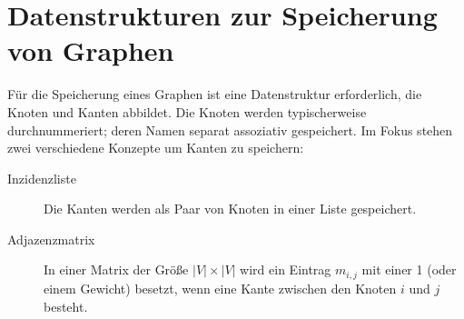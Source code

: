 \section{Datenstrukturen zur Speicherung von Graphen}
%
Für die Speicherung eines Graphen ist eine Datenstruktur erforderlich, die Knoten und Kanten abbildet. Die Knoten werden typischerweise durchnummeriert; deren Namen separat assoziativ gespeichert. Im Fokus stehen zwei verschiedene Konzepte um Kanten zu speichern:
%
\begin{description}
  \item[Inzidenzliste]
    Die Kanten werden als Paar von Knoten in einer Liste gespeichert.
  \item[Adjazenzmatrix]
    In einer Matrix der Größe $|V|\times |V|$ wird ein Eintrag $m_{i,j}$ mit einer 1 (oder einem Gewicht) besetzt,
    wenn eine Kante zwischen den Knoten $i$ und $j$ besteht.
\end{description}